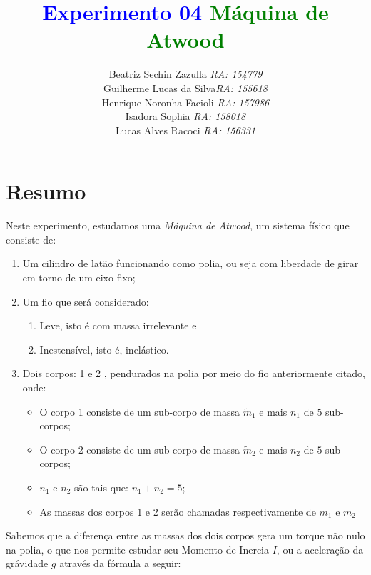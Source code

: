 \documentclass[10pt,english]{article}
\begin{document}
\title{\vspace{50mm}
 \textbf{\textcolor{blue}{\Huge{Experimento 04 }}}\textbf{\textcolor{green}{\Huge{Máquina
de Atwood}}}}


\author{Beatriz Sechin Zazulla \hfill{}\textit{RA: 154779}\protect\\
 Guilherme Lucas da Silva\hfill{}\textit{RA: 155618}\protect\\
 Henrique Noronha Facioli \hfill{}\textit{RA: 157986}\protect\\
 Isadora Sophia \hfill{}\textit{RA: 158018}\protect\\
 Lucas Alves Racoci \hfill{}\textit{RA: 156331} }

\maketitle
\newpage{}


\section{Resumo}

Neste experimento, estudamos uma \emph{Máquina de Atwood}, um sistema
físico que consiste de: 
\begin{enumerate}
\item Um cilindro de latão funcionando como polia, ou seja com liberdade
de girar em torno de um eixo fixo; 
\item Um fio que será considerado:

\begin{enumerate}
\item Leve, isto é com massa irrelevante e 
\item Inestensível, isto é, inelástico. 
\end{enumerate}
\item Dois corpos: 1 e 2 , pendurados na polia por meio do fio anteriormente
citado, onde:

\begin{itemize}
\item O corpo 1 consiste de um sub-corpo de massa $\widetilde{m}_{1}$ e
mais $n_{1}$ de $5$ sub-corpos; 
\item O corpo 2 consiste de um sub-corpo de massa $\widetilde{m}_{2}$ e
mais $n_{2}$ de $5$ sub-corpos; 
\item $n_{1}$ e $n_{2}$ são tais que: $n_{1}+n_{2}=5$; 
\item As massas dos corpos 1 e 2 serão chamadas respectivamente de $m_{1}$
e $m_{2}$ 
\end{itemize}
\end{enumerate}
Sabemos que a diferença entre as massas dos dois corpos gera um torque
não nulo na polia, o que nos permite estudar seu Momento de Inercia
$I$, ou a aceleração da grávidade $g$ através da fórmula a seguir:
\end{document}
